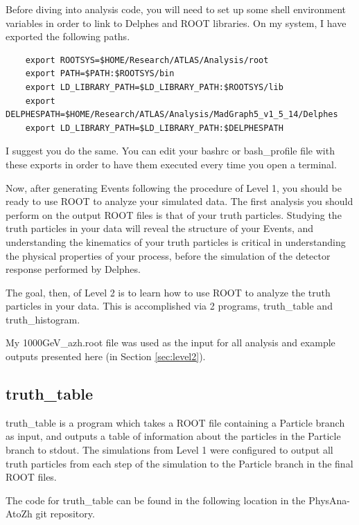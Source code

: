 \documentclass{article}
\begin{document}
Before diving into analysis code, you will need to set up some shell environment variables in order to link to
Delphes and ROOT libraries. On my system, I have exported the following paths.

\begin{verbatim}
	export ROOTSYS=$HOME/Research/ATLAS/Analysis/root
	export PATH=$PATH:$ROOTSYS/bin
	export LD_LIBRARY_PATH=$LD_LIBRARY_PATH:$ROOTSYS/lib
	export DELPHESPATH=$HOME/Research/ATLAS/Analysis/MadGraph5_v1_5_14/Delphes
	export LD_LIBRARY_PATH=$LD_LIBRARY_PATH:$DELPHESPATH
\end{verbatim}

I suggest you do the same. You can edit your bashrc or bash\_profile file with these exports in order to have
them executed every time you open a terminal.

\bigskip

Now, after generating Events following the procedure of Level 1, you should be ready to use
ROOT to analyze your simulated data. The first analysis you should perform on the output ROOT files
is that of your truth particles. Studying the truth particles in your data will reveal the
structure of your Events, and understanding the kinematics of your truth particles is critical
in understanding the physical properties of your process, before the simulation of the detector
response performed by Delphes.

\bigskip

The goal, then, of Level 2 is to learn how to use ROOT to analyze the truth particles in your
data. This is accomplished via 2 programs, truth\_table and truth\_histogram.

\bigskip

My 1000GeV\_azh.root file was used as the input for all analysis and example outputs presented here (in Section \ref{sec:level2}).

\subsection{truth\_table}

truth\_table is a program which takes a ROOT file containing a Particle branch
as input, and outputs a table of information about the particles in the Particle
branch to stdout. The simulations from Level 1 were configured to output all truth particles
from each step of the simulation to the Particle branch in the final ROOT files.

\bigskip

The code for truth\_table can be found in the following location in the PhysAna-AtoZh git repository.
\end{document}
